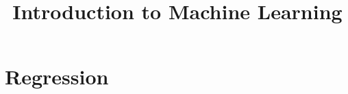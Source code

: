 




\newcommand{\titlefigure}{figure_man/optimization_steps.jpeg}
\newcommand{\learninggoals}{
\item Understand that an ML model is simply a parametrized curve
\item Understand that the hypothesis space lists all admissible models
    for a learner
\item Understand the relationship between the hypothesis space and the parameter space
}

\title{Introduction to Machine Learning}
\date{}



\section{Regression}

